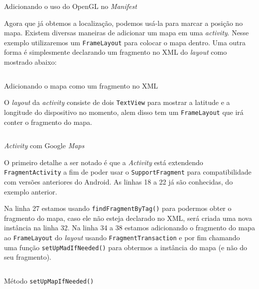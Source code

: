\documentclass[a4paper,12pt,brazil]{book}
\begin{document}
\begin{singlespace}
		\begin{listing}[H]
		\inputminted[linenos=true,fontsize=\small,frame=lines, framesep=2mm, tabsize=2,numbersep=5pt]{xml}{src/api/maps/opengl.xml}
		\caption{Adicionando o uso do OpenGL no \emph{Manifest}}
		\label{code:mapfrag}
		\end{listing} 	

		Agora que já obtemos a localização, podemos usá-la para marcar a posição no mapa. Existem diversas maneiras de adicionar um mapa em uma \emph{activity}. Nesse exemplo utilizaremos um \texttt{FrameLayout} para colocar o mapa dentro. Uma outra forma é simplesmente declarando um fragmento no XML do \emph{layout} como mostrado abaixo:

		\begin{listing}[H]
		\inputminted[linenos=true,fontsize=\small,frame=lines, framesep=2mm, tabsize=2,numbersep=5pt]{xml}{src/api/maps/frag.xml}
		\caption{Adicionando o mapa como um fragmento no XML}
		\label{code:mapfrag}
		\end{listing} 	
		
		O \emph{layout} da \emph{activity} consiste de dois \texttt{TextView} para mostrar a latitude e a longitude do dispositivo no momento, alem disso tem um \texttt{FrameLayout} que irá conter o fragmento do mapa.

		\begin{listing}[H]
		\inputminted[linenos=true,fontsize=\small,frame=lines, framesep=2mm, tabsize=2,numbersep=5pt]{java}{src/api/maps/activity.java}
		\caption{\emph{Activity} com Google \emph{Maps}}
		\label{code:mapactivity}
		\end{listing} 	
		
		O primeiro detalhe a ser notado é que a \emph{Activity} está extendendo \texttt{FragmentActivity} a fim de poder usar o \texttt{SupportFragment} para compatibilidade com versões anteriores do Android. As linhas 18 a 22 já são conhecidas, do exemplo anterior. 

		Na linha 27 estamos usando \texttt{findFragmentByTag()} para podermos obter o fragmento do mapa, caso ele não esteja declarado no XML, será criada uma nova instância na linha 32. Na linha 34 a 38 estamos adicionando o fragmento do mapa ao \texttt{FrameLayout} do \emph{layout} usando \texttt{FragmentTransaction} e por fim chamando uma função \texttt{setUpMadIfNeeded()} para obtermos a instância do mapa (e não do seu fragmento). 

		\begin{listing}[H]
		\inputminted[linenos=true,fontsize=\small,frame=lines, framesep=2mm, tabsize=2,numbersep=5pt]{java}{src/api/maps/setupif.java}
		\caption{Método \texttt{setUpMapIfNeeded()}}
		\label{code:setupif}
		\end{listing} 	


\end{singlespace}
\end{document}
